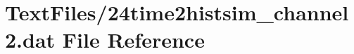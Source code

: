 \hypertarget{24time2histsim__channel2_8dat}{}\section{Text\+Files/24time2histsim\+\_\+channel2.dat File Reference}
\label{24time2histsim__channel2_8dat}
